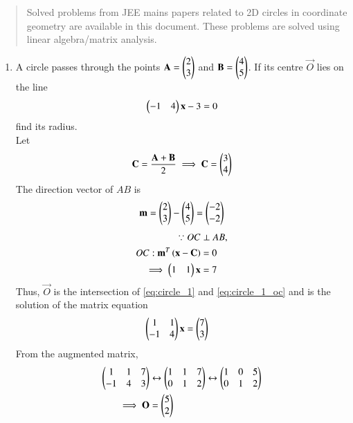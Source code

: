\documentclass[journal,12pt,twocolumn]{IEEEtran}
\begin{document}
\begin{abstract}
	Solved problems from JEE mains papers related to 2D circles in coordinate geometry are 
available in this document.  These problems are solved using linear algebra/matrix analysis.
\end{abstract}
\begin{enumerate}[label=\arabic*]
\item A circle passes through the points $\mathbf{A}=\begin{pmatrix}2 \\ 3\end{pmatrix}$ and $\mathbf{B} = \begin{pmatrix}4 \\  5\end{pmatrix}$.  If its centre $\vec{O}$ lies on the 
line
\begin{equation}
\label{eq:circle_1}
\begin{pmatrix}-1 & 4\end{pmatrix}\mathbf{x} - 3 =0
\end{equation}
%
find its radius.
\\
\solution Let 
\begin{align}
\mathbf{C}=\frac{\mathbf{A}+\mathbf{B}}{2}
\implies \mathbf{C}=\begin{pmatrix}3 \\ 4\end{pmatrix}
\label{eq:circle_1_c}
\end{align}
The direction vector of $AB$ is 
\begin{align}
\label{eq:circle_1_m}
\mathbf{m} = \begin{pmatrix}2 \\ 3\end{pmatrix}-\begin{pmatrix}4 \\  5\end{pmatrix}
= \begin{pmatrix}-2 \\ -2\end{pmatrix}
\end{align}
\begin{align}
\because OC &\perp AB,
\nonumber \\
OC: \mathbf{m}^T\left(\mathbf{x}-\mathbf{C}\right)&=0
\nonumber \\
\implies \begin{pmatrix}1 & 1\end{pmatrix}\mathbf{x} &= 7
\label{eq:circle_1_oc}
\end{align}
%
Thus, $\vec{O}$ is the intersection of \eqref{eq:circle_1}
and \eqref{eq:circle_1_oc} and is the solution of the matrix equation
\begin{align}
 \begin{pmatrix}1 & 1 \\ -1 & 4\end{pmatrix}\mathbf{x} &= \begin{pmatrix}7 \\ 3\end{pmatrix}
\label{eq:circle_1_matrix}
\end{align}
%
From the augmented matrix,
\begin{align}
 \myvec{1 & 1 &7\\ -1 & 4 & 3}&\leftrightarrow  \myvec{1 & 1 &7\\ 0 & 1 & 2}\leftrightarrow \myvec{1 & 0 & 5\\ 0 & 1 & 2} 
\nonumber \\
\implies \vec{O} &= \myvec{5 \\ 2}

\end{align}
\end{enumerate}
\end{document}

